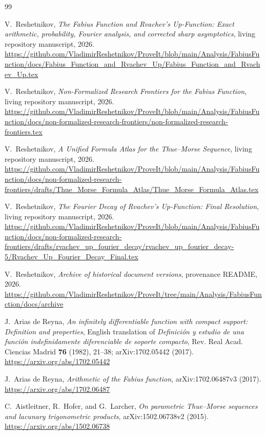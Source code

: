 \documentclass[11pt,oneside]{article}
\numberwithin{equation}{section}
\theoremstyle{definition}
\theoremstyle{remark}
\begin{document}
\begin{thebibliography}{99}

V.~Reshetnikov,
\emph{The Fabius Function and Rvachev's Up-Function: Exact arithmetic, probability, Fourier
analysis, and corrected sharp asymptotics}, living repository manuscript, 2026.
\url{https://github.com/VladimirReshetnikov/ProveIt/blob/main/Analysis/FabiusFunction/docs/Fabius_Function_and_Rvachev_Up/Fabius_Function_and_Rvachev_Up.tex}

V.~Reshetnikov,
\emph{Non-Formalized Research Frontiers for the Fabius Function}, living repository
manuscript, 2026.
\url{https://github.com/VladimirReshetnikov/ProveIt/blob/main/Analysis/FabiusFunction/docs/non-formalized-research-frontiers/non-formalized-research-frontiers.tex}

V.~Reshetnikov,
\emph{A Unified Formula Atlas for the Thue--Morse Sequence}, living repository manuscript,
2026.
\url{https://github.com/VladimirReshetnikov/ProveIt/blob/main/Analysis/FabiusFunction/docs/non-formalized-research-frontiers/drafts/Thue_Morse_Formula_Atlas/Thue_Morse_Formula_Atlas.tex}

V.~Reshetnikov,
\emph{The Fourier Decay of Rvachev's Up-Function: Final Resolution}, living repository
manuscript, 2026.
\url{https://github.com/VladimirReshetnikov/ProveIt/blob/main/Analysis/FabiusFunction/docs/non-formalized-research-frontiers/drafts/rvachev_up_fourier_decay/rvachev_up_fourier_decay-5/Rvachev_Up_Fourier_Decay_Final.tex}

V.~Reshetnikov,
\emph{Archive of historical document versions}, provenance README, 2026.
\url{https://github.com/VladimirReshetnikov/ProveIt/tree/main/Analysis/FabiusFunction/docs/archive}

J.~Arias de Reyna,
\emph{An infinitely differentiable function with compact support: Definition and properties},
English translation of \emph{Definici\'on y estudio de una funci\'on indefinidamente
diferenciable de soporte compacto}, Rev. Real Acad. Ciencias Madrid \textbf{76} (1982),
21--38; arXiv:1702.05442 (2017).
\url{https://arxiv.org/abs/1702.05442}

J.~Arias de Reyna,
\emph{Arithmetic of the Fabius function}, arXiv:1702.06487v3 (2017).
\url{https://arxiv.org/abs/1702.06487}

C.~Aistleitner, R.~Hofer, and G.~Larcher,
\emph{On parametric Thue--Morse sequences and lacunary trigonometric products},
arXiv:1502.06738v2 (2015).
\url{https://arxiv.org/abs/1502.06738}


\end{thebibliography}
\end{document}

